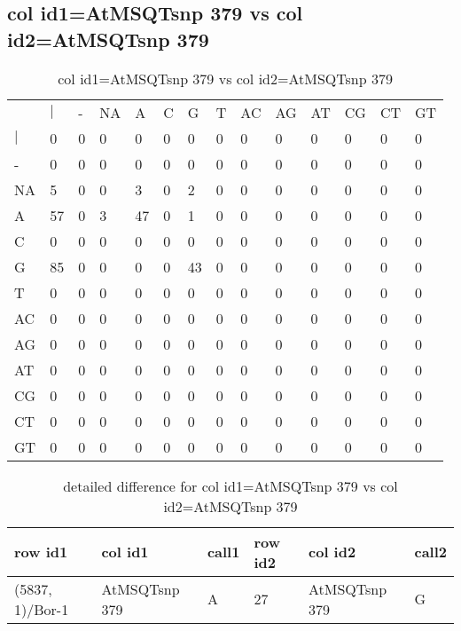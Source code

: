 \subsection{col id1=AtMSQTsnp 379 vs col id2=AtMSQTsnp 379}
\begin{center}
\begin{longtable}{|l|l|l|l|l|l|l|l|l|l|l|l|l|l|}
\caption{col id1=AtMSQTsnp 379 vs col id2=AtMSQTsnp 379} \label{table_dm702}\\
\hline
\\
\hline
&$|$&-&NA&A&C&G&T&AC&AG&AT&CG&CT&GT\\
$|$&0&0&0&0&0&0&0&0&0&0&0&0&0\\
-&0&0&0&0&0&0&0&0&0&0&0&0&0\\
NA&5&0&0&3&0&2&0&0&0&0&0&0&0\\
A&57&0&3&47&0&1&0&0&0&0&0&0&0\\
C&0&0&0&0&0&0&0&0&0&0&0&0&0\\
G&85&0&0&0&0&43&0&0&0&0&0&0&0\\
T&0&0&0&0&0&0&0&0&0&0&0&0&0\\
AC&0&0&0&0&0&0&0&0&0&0&0&0&0\\
AG&0&0&0&0&0&0&0&0&0&0&0&0&0\\
AT&0&0&0&0&0&0&0&0&0&0&0&0&0\\
CG&0&0&0&0&0&0&0&0&0&0&0&0&0\\
CT&0&0&0&0&0&0&0&0&0&0&0&0&0\\
GT&0&0&0&0&0&0&0&0&0&0&0&0&0\\
\hline
\end{longtable}
\end{center}

\begin{center}
\begin{longtable}{|l|l|l|l|l|l|}
\caption{detailed difference for col id1=AtMSQTsnp 379 vs col id2=AtMSQTsnp 379} \label{table_dm703}\\
\hline
row id1&col id1&call1&row id2&col id2&call2\\
\hline
(5837, 1)/Bor-1&AtMSQTsnp 379&A&27&AtMSQTsnp 379&G\\
\hline
\end{longtable}
\end{center}

